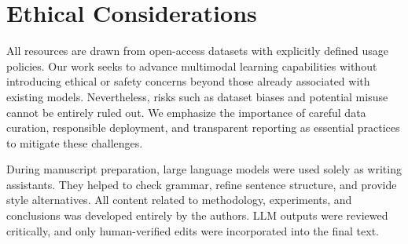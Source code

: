 \documentclass[11pt]{article}
\begin{document}
\section{Ethical Considerations}
All resources are drawn from open-access datasets with explicitly defined usage policies. Our work seeks to advance multimodal learning capabilities without introducing ethical or safety concerns beyond those already associated with existing models. Nevertheless, risks such as dataset biases and potential misuse cannot be entirely ruled out. We emphasize the importance of careful data curation, responsible deployment, and transparent reporting as essential practices to mitigate these challenges. 

During manuscript preparation, large language models were used solely as writing assistants. 
They helped to check grammar, refine sentence structure, and provide style alternatives. 
All content related to methodology, experiments, and conclusions was developed entirely by the authors. 
LLM outputs were reviewed critically, and only human-verified edits were incorporated into the final text. 



\end{document}
